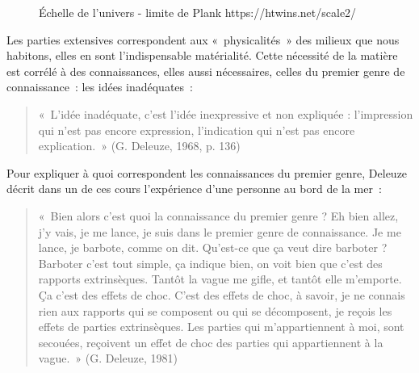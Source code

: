 \documentclass[
  a4paper,
  DIV=11,
  numbers=noendperiod]{scrreprt}
\begin{document}
\begin{figure}


\caption{\label{fig-echelleUniversPlank}Échelle de l'univers - limite de
Plank https://htwins.net/scale2/}

\end{figure}%

Les parties extensives correspondent aux «~physicalités~» des milieux
que nous habitons, elles en sont l'indispensable matérialité. Cette
nécessité de la matière est corrélé à des connaissances, elles aussi
nécessaires, celles du premier genre de connaissance~: les idées
inadéquates~:

\begin{quote}
«~L'idée inadéquate, c'est l'idée inexpressive et non expliquée :
l'impression qui n'est pas encore expression, l'indication qui n'est pas
encore explication.~» (G. Deleuze, 1968, p. 136)
\end{quote}

Pour expliquer à quoi correspondent les connaissances du premier genre,
Deleuze décrit dans un de ces cours l'expérience d'une personne au bord
de la mer~:

\begin{quote}
«~Bien alors c'est quoi la connaissance du premier genre ? Eh bien
allez, j'y vais, je me lance, je suis dans le premier genre de
connaissance. Je me lance, je barbote, comme on dit. Qu'est-ce que ça
veut dire barboter ? Barboter c'est tout simple, ça indique bien, on
voit bien que c'est des rapports extrinsèques. Tantôt la vague me gifle,
et tantôt elle m'emporte. Ça c'est des effets de choc. C'est des effets
de choc, à savoir, je ne connais rien aux rapports qui se composent ou
qui se décomposent, je reçois les effets de parties extrinsèques. Les
parties qui m'appartiennent à moi, sont secouées, reçoivent un effet de
choc des parties qui appartiennent à la vague.~» (G. Deleuze, 1981)
\end{quote}
\end{document}
